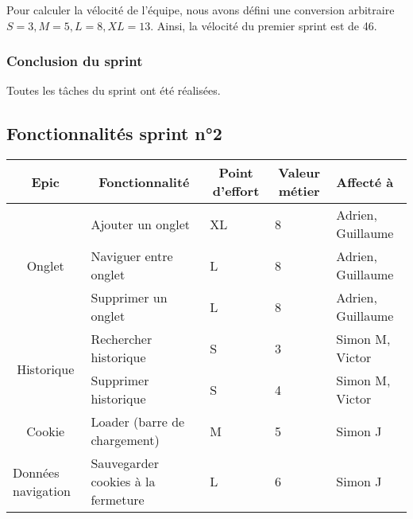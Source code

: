 \documentclass[10pt,a4paper]{article}
\begin{document}
Pour calculer la vélocité de l'équipe, nous avons défini une conversion arbitraire $S = 3, M = 5, L = 8, XL = 13$. Ainsi, la vélocité du premier sprint est de 46.

\subsubsection{Conclusion du sprint}
Toutes les tâches du sprint ont été réalisées. 

\subsection{Fonctionnalités sprint n°2}

\begin{table}[h]
\begin{tabular}{|c|l|l|l|l|}
\hline
\textbf{Epic}                            & \multicolumn{1}{c|}{\textbf{Fonctionnalité}} & \multicolumn{1}{c|}{\textbf{Point d'effort}} & \multicolumn{1}{c|}{\textbf{Valeur métier}} & \textbf{Affecté à} \\ \hline
\multirow{3}{*}{Onglet}                  & Ajouter un onglet                            & XL                                           & 8                                           & Adrien, Guillaume  \\ \cline{2-5} 
                                         & Naviguer entre onglet                        & L                                            & 8                                           & Adrien, Guillaume  \\ \cline{2-5} 
                                         & Supprimer un onglet                          & L                                            & 8                                           & Adrien, Guillaume  \\ \hline
\multirow{2}{*}{Historique}              & Rechercher historique                        & S                                            & 3                                           & Simon M, Victor    \\ \cline{2-5} 
                                         & Supprimer historique                         & S                                            & 4                                           & Simon M, Victor    \\ \hline
Cookie                                   & Loader (barre de chargement)                 & M                                            & 5                                           & Simon J            \\ \hline
\multicolumn{1}{|l|}{Données navigation} & Sauvegarder cookies à la fermeture           & L                                            & 6                                           & Simon J            \\ \hline
\end{tabular}
\end{table}
\end{document}
